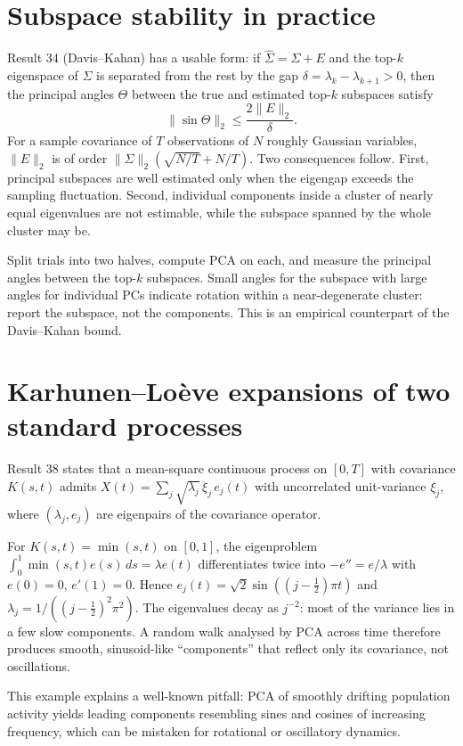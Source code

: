 \section{Subspace stability in practice}
Result 34 (Davis--Kahan) has a usable form: if $\hat\Sigma=\Sigma+E$
and the top-$k$ eigenspace of $\Sigma$ is separated from the rest by
the gap $\delta=\lambda_k-\lambda_{k+1}>0$, then the principal angles
$\Theta$ between the true and estimated top-$k$ subspaces satisfy
\[
\|\sin\Theta\|_2\le\frac{2\|E\|_2}{\delta}.
\]
For a sample covariance of $T$ observations of $N$ roughly Gaussian
variables, $\|E\|_2$ is of order $\|\Sigma\|_2(\sqrt{N/T}+N/T)$. Two
consequences follow. First, principal subspaces are well estimated only
when the eigengap exceeds the sampling fluctuation. Second, individual
components inside a cluster of nearly equal eigenvalues are not
estimable, while the subspace spanned by the whole cluster may be.

\begin{example}
Split trials into two halves, compute PCA on each, and measure the
principal angles between the top-$k$ subspaces. Small angles for the
subspace with large angles for individual PCs indicate rotation within
a near-degenerate cluster: report the subspace, not the components.
This is an empirical counterpart of the Davis--Kahan bound.
\end{example}

\section{Karhunen--Lo\`eve expansions of two standard processes}
Result 38 states that a mean-square continuous process on $[0,T]$ with
covariance $K(s,t)$ admits $X(t)=\sum_j\sqrt{\lambda_j}\,\xi_j\,e_j(t)$
with uncorrelated unit-variance $\xi_j$, where $(\lambda_j,e_j)$ are
eigenpairs of the covariance operator.
\begin{example}
For $K(s,t)=\min(s,t)$ on $[0,1]$, the eigenproblem
$\int_0^1\min(s,t)e(s)\,ds=\lambda e(t)$ differentiates twice into
$-e''=e/\lambda$ with $e(0)=0$, $e'(1)=0$. Hence
$e_j(t)=\sqrt2\sin((j-\tfrac12)\pi t)$ and
$\lambda_j=1/((j-\tfrac12)^2\pi^2)$. The eigenvalues decay as $j^{-2}$:
most of the variance lies in a few slow components. A random walk
analysed by PCA across time therefore produces smooth, sinusoid-like
``components'' that reflect only its covariance, not oscillations.
\end{example}
This example explains a well-known pitfall: PCA of smoothly drifting
population activity yields leading components resembling sines and
cosines of increasing frequency, which can be mistaken for rotational
or oscillatory dynamics.

